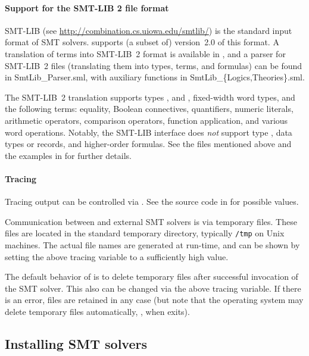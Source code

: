 \paragraph{Support for the SMT-LIB 2 file format}

SMT-LIB (see \url{http://combination.cs.uiowa.edu/smtlib/}) is the
standard input format of SMT solvers.   supports (a
subset of) version~2.0 of this format.  A translation of \HOL{} terms
into SMT-LIB~2 format is available in , and a parser
for SMT-LIB~2 files (translating them into \HOL{} types, terms, and
formulas) can be found in {SmtLib\_Parser.sml}, with auxiliary
functions in {SmtLib\_\{Logics,Theories\}.sml}.

The SMT-LIB~2 translation supports types , 
and , fixed-width word types, and the following terms:
equality, Boolean connectives, quantifiers, numeric literals,
arithmetic operators, comparison operators, function application, and
various word operations.  Notably, the SMT-LIB interface does
\emph{not} support type , data types or records, and
higher-order formulas.  See the files mentioned above and the examples
in  for further details.

\paragraph{Tracing}

Tracing output can be controlled via .  See the source code in  for
possible values.

Communication between \HOL{} and external SMT solvers is via temporary
files.  These files are located in the standard temporary directory,
typically {\tt /tmp} on Unix machines.  The actual file names are
generated at run-time, and can be shown by setting the above tracing
variable to a sufficiently high value.

The default behavior of  is to delete temporary files
after successful invocation of the SMT solver.  This also can be
changed via the above tracing variable.  If there is an error, files
are retained in any case (but note that the operating system may
delete temporary files automatically, \eg, when \HOL{} exits).

\subsection{Installing SMT solvers}

